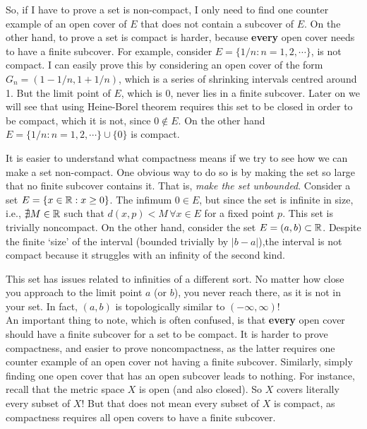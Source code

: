 So, if I have to prove a set is non-compact, I only need to find one counter example of an open cover of $E$ that does not contain a subcover of $E$.
On the other hand, to prove a set is compact is harder, because \textbf{every} open cover needs to have a finite subcover. For example, consider $E=\{1/n:n=1,2,\cdots\}$, is not compact. I can easily prove this by considering an open cover of the form $G_n=(1-1/n,1+1/n)$, which is a series of shrinking intervals centred around 1. But the limit point of $E$, which is $0$, never lies in a finite subcover.
Later on we will see that using Heine-Borel theorem requires this set to be closed in order to be compact, which it is not, since $0\notin E$.
On the other hand $E=\{1/n:n=1,2,\cdots\}\cup\{0\}$ is compact.

It is easier to understand what compactness means if we try to see how we can make a set non-compact. One obvious way to do so is by making the set so large that no finite subcover contains it. That is, \textit{make the set unbounded}. Consider a set $E=\{x\in \mathbb{R} : x\geq0\}$. The infimum $0\in E$, but since the set is infinite in size, i.e., $\nexists M \in \mathbb{R}$ such that $d(x,p)<M\,\forall x\in E$ for a fixed point $p$. This set is trivially noncompact. On the other hand, consider the set $E=(a,b)\subset\mathbb{R}$. Despite the finite `size' of the interval (bounded trivially by $|b-a|$),the interval is not compact because it struggles with an infinity of the second kind.

\begin{center}
\end{center}

This set has issues related to infinities of a different sort. No matter how close you approach to the limit point $a$ (or $b$), you never reach there, as it is not in your set. In fact, $(a,b)$ is topologically similar to $(-\infty,\infty)$! \\
An important thing to note, which is often confused, is that \textbf{every} open cover should have a finite subcover for a set to be compact. It is harder to prove compactness, and easier to prove noncompactness, as the latter requires one counter example of an open cover not having a finite subcover. Similarly, simply finding one open cover that has an open subcover leads to nothing. For instance, recall that the metric space $X$ is open (and also closed). So $X$ covers literally every subset of $X$! But that does not mean every subset of $X$ is compact, as compactness requires all open covers to have a finite subcover.\\

